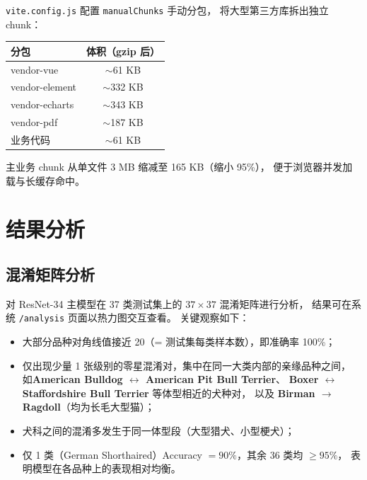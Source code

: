 \documentclass[12pt, a4paper, openany]{ctexbook}
\begin{document}
\texttt{vite.config.js} 配置 \texttt{manualChunks} 手动分包，
将大型第三方库拆出独立 chunk：

\begin{center}
\begin{tabular}{L{4cm}c}
  \toprule
  \textbf{分包} & \textbf{体积（gzip 后）} \\
  \midrule
  vendor-vue     & $\sim$61 KB \\
  vendor-element & $\sim$332 KB \\
  vendor-echarts & $\sim$343 KB \\
  vendor-pdf     & $\sim$187 KB \\
  业务代码        & $\sim$61 KB \\
  \bottomrule
\end{tabular}
\end{center}

主业务 chunk 从单文件 3 MB 缩减至 165 KB（缩小 95\%），
便于浏览器并发加载与长缓存命中。

\chapter{结果分析}
\label{ch:analysis}

\section{混淆矩阵分析}

对 ResNet-34 主模型在 37 类测试集上的 $37 \times 37$ 混淆矩阵进行分析，
结果可在系统 \texttt{/analysis} 页面以热力图交互查看。
关键观察如下：

\begin{itemize}[leftmargin=*]
  \item 大部分品种对角线值接近 20（= 测试集每类样本数），即准确率 100\%；
  \item 仅出现少量 1 张级别的零星混淆对，集中在同一大类内部的亲缘品种之间，
        如\textbf{American Bulldog $\leftrightarrow$ American Pit Bull Terrier}、
        \textbf{Boxer $\leftrightarrow$ Staffordshire Bull Terrier} 等体型相近的犬种对，
        以及 \textbf{Birman $\rightarrow$ Ragdoll}（均为长毛大型猫）；
  \item 犬科之间的混淆多发生于同一体型段（大型猎犬、小型梗犬）；
  \item 仅 1 类（German Shorthaired）Accuracy $= 90\%$，其余 36 类均 $\geq 95\%$，
        表明模型在各品种上的表现相对均衡。
\end{itemize}
\end{document}
